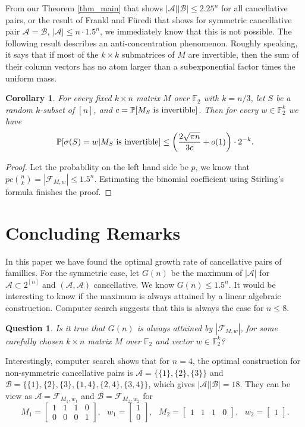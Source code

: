 \documentclass{article}
\newtheorem{corollary}[theorem]{Corollary}
\newtheorem{question}[theorem]{Question}
\begin{document}
From our Theorem \ref{thm_main} that shows $|\mathcal{A}||\mathcal{B}| \le 2.25^n$ for all cancellative pairs, or the result of Frankl and F\"uredi that shows for symmetric cancellative pair $\mathcal{A}=\mathcal{B}$, $|\mathcal{A}| \le n \cdot 1.5^n$, we immediately know that this is not possible. The following result describes an anti-concentration phenomenon. Roughly speaking, it says that if most of the $k \times k$ submatrices of $M$ are invertible, then the sum of their column vectors has no atom larger than a subexponential factor times the uniform mass.

\begin{corollary}
For every fixed $k \times n$ matrix $M$ over $\mathbb{F}_2$ with $k=n/3$, let $S$ be a random $k$-subset of $[n]$, and $c=\mathbb{P}[M_S\textup{~is~invertible}]$. Then for every $w \in \mathbb{F}_2^k$ we have 
$$\mathbb{P}[\sigma(S)=w| M_S\textup{~is~invertible}] \le \left(\frac{2\sqrt{\pi n}}{3c}+o(1)\right)\cdot 2^{-k}.$$
\end{corollary}
\begin{proof}
Let the probability on the left hand side be $p$, we know that $pc\binom{n}{k}=|\mathcal{F}_{M, w}| \le 1.5^n$. Estimating the binomial coefficient using Stirling's formula finishes the proof.
\end{proof}

\section{Concluding Remarks}
In this paper we have found the optimal growth rate of cancellative pairs of famillies. For the symmetric case, let $G(n)$ be the maximum of $|\mathcal{A}|$ for $\mathcal{A} \subset 2^{[n]}$ and $(\mathcal{A}, \mathcal{A})$ cancellative. We know $G(n) \le 1.5^n$. It would be interesting to know if the maximum is always attained by a linear algebraic construction. Computer search suggests that this is always the case for $n \le 8$. 
\begin{question}
Is it true that $G(n)$ is always attained by $|\mathcal{F}_{M, w}|$, for some carefully chosen $k \times n$ matrix $M$ over $\mathbb{F}_2$ and vector $w \in \mathbb{F}_2^k$?
\end{question}

Interestingly, computer search shows that for $n=4$, the optimal construction for non-symmetric cancellative pairs is $\mathcal{A}=\{\{1\},\{2\},\{3\}\}$ and $\mathcal{B}=\{\{1\},\{2\},\{3\},\{1,4\},\{2,4\},\{3,4\}\}$, which gives $|\mathcal{A}||\mathcal{B}|=18$. They can be view as $\mathcal{A}=\mathcal{F}_{M_1,w_1}$ and $\mathcal{B}=\mathcal{F}_{M_2,w_2}$ for 
$$M_1=\begin{bmatrix}
1 & 1 & 1 & 0\\
0 & 0 & 0 & 1
\end{bmatrix},~~~w_1=\begin{bmatrix}1\\0\end{bmatrix},~~~M_2=\begin{bmatrix}1 & 1& 1 & 0\end{bmatrix},~~~w_2=\begin{bmatrix}1\end{bmatrix}.$$
\end{document}
